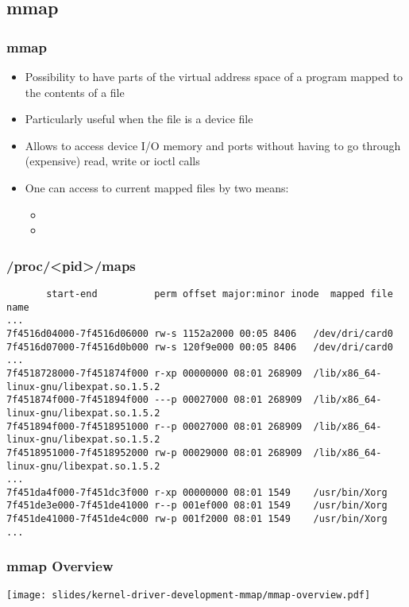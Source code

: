 \subsection{mmap}

\begin{frame}
  \frametitle{mmap}
  \begin{itemize}
  \item Possibility to have parts of the virtual address space of a
    program mapped to the contents of a file
  \item Particularly useful when the file is a device file
  \item Allows to access device I/O memory and ports without having to
    go through (expensive) read, write or ioctl calls
  \item One can access to current mapped files by two means:
    \begin{itemize}
    \item {}
    \item {}
    \end{itemize}
  \end{itemize}
\end{frame}

\begin{frame}[fragile]
  \frametitle{/proc/\textless pid\textgreater/maps}
{\tiny
\begin{verbatim}
       start-end          perm offset major:minor inode  mapped file name
...
7f4516d04000-7f4516d06000 rw-s 1152a2000 00:05 8406   /dev/dri/card0
7f4516d07000-7f4516d0b000 rw-s 120f9e000 00:05 8406   /dev/dri/card0
...
7f4518728000-7f451874f000 r-xp 00000000 08:01 268909  /lib/x86_64-linux-gnu/libexpat.so.1.5.2
7f451874f000-7f451894f000 ---p 00027000 08:01 268909  /lib/x86_64-linux-gnu/libexpat.so.1.5.2
7f451894f000-7f4518951000 r--p 00027000 08:01 268909  /lib/x86_64-linux-gnu/libexpat.so.1.5.2
7f4518951000-7f4518952000 rw-p 00029000 08:01 268909  /lib/x86_64-linux-gnu/libexpat.so.1.5.2
...
7f451da4f000-7f451dc3f000 r-xp 00000000 08:01 1549    /usr/bin/Xorg
7f451de3e000-7f451de41000 r--p 001ef000 08:01 1549    /usr/bin/Xorg
7f451de41000-7f451de4c000 rw-p 001f2000 08:01 1549    /usr/bin/Xorg
...
\end{verbatim}
}
\end{frame}

\begin{frame}
  \frametitle{mmap Overview}
  \begin{center}
    \texttt{[image: slides/kernel-driver-development-mmap/mmap-overview.pdf]}
  \end{center}
\end{frame}

